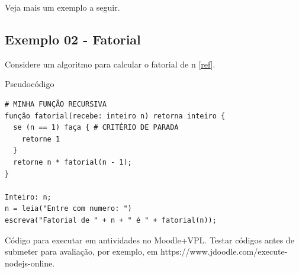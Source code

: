 \documentclass[12pt,a4paper]{article}
\begin{document}
Veja mais um exemplo a seguir.

    \hypertarget{exemplo-02---fatorial}{%
\subsection{Exemplo 02 - Fatorial}\label{exemplo-02---fatorial}}

Considere um algoritmo para calcular o fatorial de n
{[}\href{https://www.inf.ufpr.br/roberto/ci067/10_aloc.html}{ref}{]}.

    Pseudocódigo

\begin{verbatim}
# MINHA FUNÇÃO RECURSIVA
função fatorial(recebe: inteiro n) retorna inteiro {
  se (n == 1) faça { # CRITÉRIO DE PARADA
    retorne 1
  }
  retorne n * fatorial(n - 1);
}

Inteiro: n;
n = leia("Entre com numero: ")
escreva("Fatorial de " + n + " é " + fatorial(n));
\end{verbatim}

    Código para executar em antividades no Moodle+VPL. Testar códigos antes
de submeter para avaliação, por exemplo, em
https://www.jdoodle.com/execute-nodejs-online.
\end{document}
